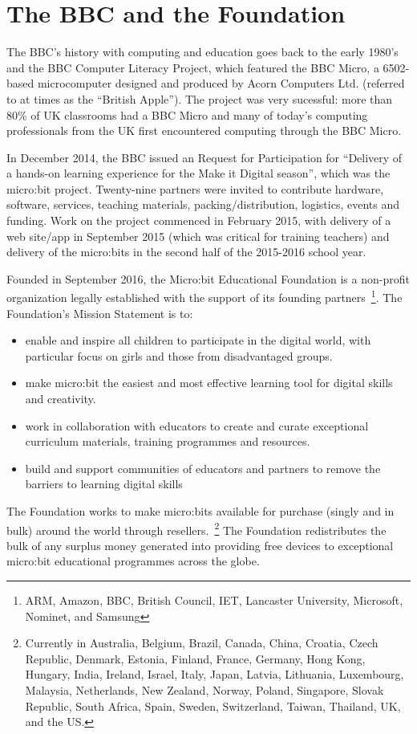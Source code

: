 \section{The BBC and the Foundation}
\label{sec:mef}

The BBC's history with computing and education goes back to the early 1980's
and the BBC Computer Literacy Project, which featured the BBC Micro, 
a 6502-based microcomputer designed and produced by Acorn Computers Ltd. (referred
to at times as the ``British Apple'').  The project was very sucessful:
more than 80\% of UK classrooms had a BBC Micro and many of today's 
computing professionals from the UK first encountered computing through
the BBC Micro.

In December 2014, the BBC issued an Request for Participation
for ``Delivery of a hands-on learning experience for the Make it Digital season'',
which was the micro:bit project.
Twenty-nine partners were invited to contribute hardware, software, services, 
teaching materials, packing/distribution, logistics, events and funding.
Work on the project commenced in February 2015, with delivery of
a web site/app in September 2015 (which was critical
for training teachers) and delivery of the micro:bits in the second
half of the 2015-2016 school year.


Founded in September 2016,
the Micro:bit Educational Foundation is a non-profit organization
legally established with the support of its founding partners~\footnote{ARM,
Amazon, BBC, British Council, IET, Lancaster University, Microsoft,
Nominet, and Samsung}. 
The Foundation's Mission Statement is to: 
\begin{itemize}
\item  enable and inspire all children to participate in the digital world, 
with particular focus on girls and those from disadvantaged groups.
\item make micro:bit the easiest and most effective learning tool for digital skills and creativity.
\item work in collaboration with educators to create and curate exceptional 
curriculum materials, training programmes and resources.
\item build and support communities of educators and partners 
to remove the barriers to learning digital skills
\end{itemize}
The Foundation works to make micro:bits available for purchase (singly and in bulk)
around the world through resellers.~\footnote{Currently in 
Australia, Belgium, Brazil, Canada, China, Croatia, Czech Republic, 
Denmark, Estonia, Finland, France, Germany, Hong Kong, Hungary, India, 
Ireland, Israel, Italy, Japan, Latvia, Lithuania, Luxembourg, Malaysia, 
Netherlands, New Zealand, Norway, Poland, Singapore, Slovak Republic, 
South Africa, Spain, Sweden, Switzerland, Taiwan, Thailand, UK, and the US.}
The Foundation redistributes the bulk of any surplus money 
generated into providing free devices to exceptional 
micro:bit educational programmes across the globe.

